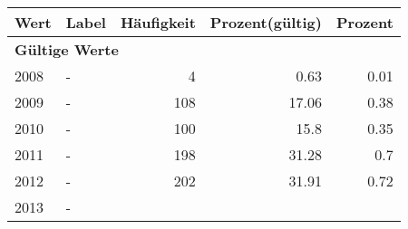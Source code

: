      \begin{longtable}{lXrrr}
     \toprule
     \textbf{Wert} & \textbf{Label} & \textbf{Häufigkeit} & \textbf{Prozent(gültig)} & \textbf{Prozent} \\
     \endhead
     \midrule
     \multicolumn{5}{l}{\textbf{Gültige Werte}}\\

     2008 &
     \multicolumn{1}{X}{ -  } &


       \num{4} &
       \num[round-mode=places,round-precision=2]{0,63} &
         \num[round-mode=places,round-precision=2]{0,01} \\

     2009 &
     \multicolumn{1}{X}{ -  } &


       \num{108} &
       \num[round-mode=places,round-precision=2]{17,06} &
         \num[round-mode=places,round-precision=2]{0,38} \\

     2010 &
     \multicolumn{1}{X}{ -  } &


       \num{100} &
       \num[round-mode=places,round-precision=2]{15,8} &
         \num[round-mode=places,round-precision=2]{0,35} \\

     2011 &
     \multicolumn{1}{X}{ -  } &


       \num{198} &
       \num[round-mode=places,round-precision=2]{31,28} &
         \num[round-mode=places,round-precision=2]{0,7} \\

     2012 &
     \multicolumn{1}{X}{ -  } &


       \num{202} &
       \num[round-mode=places,round-precision=2]{31,91} &
         \num[round-mode=places,round-precision=2]{0,72} \\

     2013 &
     \multicolumn{1}{X}{ -  } &



\end{longtable}
